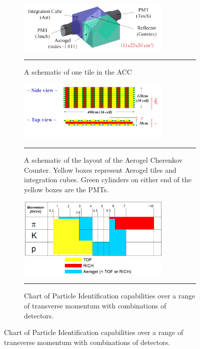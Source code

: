 \begin{figure}
\begin{subfigure}[p]{1\textwidth}
   \centering
    \includegraphics[width=0.8\textwidth]{Figures/aerogelchannel.JPG}
  \caption[A schematic of one tile in the ACC]{A schematic of one tile in the ACC}
  \label{fig:accchannel}
    \rule{35em}{0.5pt}\end{subfigure}
\begin{subfigure}[p]{1\textwidth}
  \centering
    \includegraphics[width=0.8\textwidth]{Figures/ACCschematic.jpg}

  \caption[A schematic of the Aerogel Cherenkov Counter]{A schematic of the layout of the Aerogel Cherenkov Counter. Yellow boxes represent Aerogel tiles and integration cubes. Green cylinders on either end of the yellow boxes are the PMTs.}
    \rule{35em}{0.5pt}
  \label{fig:ACCschematic}
\end{subfigure}
\begin{subfigure}[p]{1\textwidth}
  \centering
    \includegraphics[width=0.8\textwidth]{Figures/accrange.jpg}
  \caption[Chart of Particle Identification capabilities over a range of transverse momentum.]{Chart of Particle Identification capabilities over a range of transverse momentum with combinations of detectors.}
    \rule{35em}{0.5pt}
  \label{fig:PIDrange}
\end{subfigure}
\end{figure}


